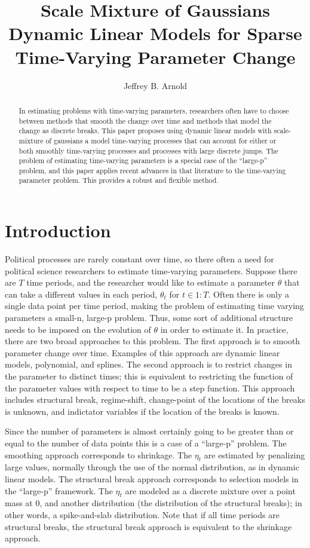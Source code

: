 \documentclass{article}
\author{Jeffrey B. Arnold}
\title{Scale Mixture of Gaussians Dynamic Linear Models for Sparse 
  Time-Varying Parameter Change}
\begin{document}
\maketitle{}

\begin{abstract}
  In estimating problems with time-varying parameters, researchers often have to choose between methods that smooth the change over time and methods that model the change as discrete breaks.
  This paper proposes using dynamic linear models with scale-mixture of gaussians a model time-varying processes that can account for either or both smoothly time-varying processes and processes with large discrete jumps.
  The problem of estimating time-varying parameters is a special case of the ``large-p'' problem, and this paper applies recent advances in that literature to the time-varying parameter problem.
  This provides a robust and flexible method. 
\end{abstract}

\section{Introduction}
\label{sec:introduction}

Political processes are rarely constant over time, so there often a need for political science researchers to estimate time-varying parameters.
Suppose there are $T$ time periods, and the researcher would like to estimate a parameter $\theta$ that can take a different values in each period, $\theta_{t}$ for $t \in 1:T$.
Often there is only a single data point per time period, making the problem of estimating time varying parameters a small-n, large-p problem. 
Thus, some sort of additional structure needs to be imposed on the evolution of $\theta$ in order to estimate it.
In practice, there are two broad approaches to this problem.
The first approach is to smooth parameter change over time.
Examples of this approach are dynamic linear models, polynomial, and splines.
The second approach is to restrict changes in the parameter to distinct times; this is equivalent to restricting the function of the parameter values with respect to time to be a step function.
This approach includes structural break, regime-shift, change-point of the locations of the breaks is unknown, and indictator variables if the location of the breaks is known.

Since the number of parameters is almost certainly going to be greater than or equal to the number of data points this is a case of a ``large-p'' problem.
The smoothing approach corresponds to shrinkage.
The $\eta_{t}$ are estimated by penalizing large values, normally through the use of the normal distribution, as in dynamic linear models.
The structural break approach corresponds to selection models in the ``large-p'' framework.
The $\eta_{t}$ are modeled as a discrete mixture over a point mass at 0, and another distribution (the distribution of the structural breaks); in other words, a spike-and-slab distribution.
Note that if all time periods are structural breaks, the structural break approach is equivalent to the shrinkage approach.
\end{document}
